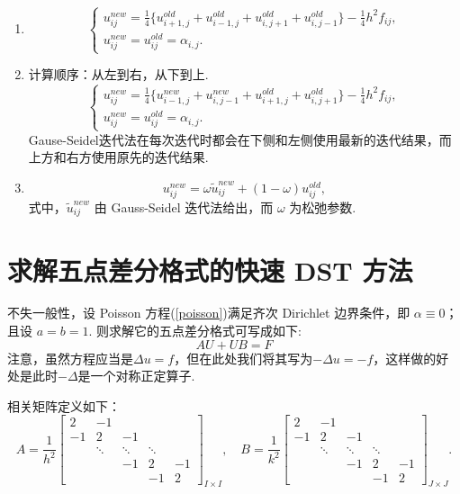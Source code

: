 \begin{enumerate}
    \item {}
    \[\begin{cases}
    u_{ij}^{new} = \frac{1}{4} \{u_{i+1,j}^{old} + u_{i-1,j}^{old} + u_{i,j+1}^{old} + u_{i,j-1}^{old}\} - \frac{1}{4} h^2 f_{ij}, \\
    u_{ij}^{new} = u_{ij}^{old} = \alpha_{i,j}.
    \end{cases}\]
    \item {}
    计算顺序：从左到右，从下到上.
    \[\begin{cases}
    u_{ij}^{new} = \frac{1}{4} \{u_{i-1,j}^{new} + u_{i,j-1}^{new} + u_{i+1,j}^{old} + u_{i,j+1}^{old}\} - \frac{1}{4} h^2 f_{ij}, \\
    u_{ij}^{new} = u_{ij}^{old} = \alpha_{i,j}.
    \end{cases}\]
    Gause-Seidel迭代法在每次迭代时都会在下侧和左侧使用最新的迭代结果，而上方和右方使用原先的迭代结果.
    \item {}
    \[ u_{ij}^{new} = \omega \tilde{u}_{ij}^{new} + (1 - \omega) u_{ij}^{old}, \]
    式中，$\tilde{u}_{ij}^{new}$ 由 Gauss-Seidel 迭代法给出，而 $\omega$ 为松弛参数.
\end{enumerate}

\section{求解五点差分格式的快速 DST 方法}

不失一般性，设 Poisson 方程(\ref{poisson})满足齐次 Dirichlet 边界条件，即 $\alpha \equiv 0$；且设 $a = b = 1$. 则求解它的五点差分格式可写成如下:
\begin{equation}
    AU + UB = F
\end{equation}
注意，虽然方程应当是$\Delta u=f$，但在此处我们将其写为$-\Delta u=-f$，这样做的好处是此时$-\Delta$是一个对称正定算子.\par

相关矩阵定义如下：
\[ A = \frac{1}{h^2} \begin{bmatrix}
2 & -1 & & \\
-1 & 2 & -1 & \\
& \ddots & \ddots & \ddots \\
& & -1 & 2 & -1 \\
& & & -1 & 2
\end{bmatrix}_{I \times I}, \quad
B = \frac{1}{k^2} \begin{bmatrix}
2 & -1 & & \\
-1 & 2 & -1 & \\
& \ddots & \ddots & \ddots \\
& & -1 & 2 & -1 \\
& & & -1 & 2
\end{bmatrix}_{J \times J}. \]

